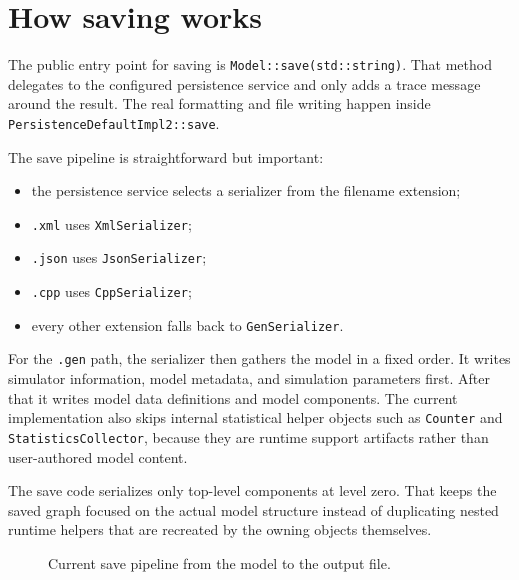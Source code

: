 \section{How saving works}
\label{sec:model-persistence-saving}

The public entry point for saving is \texttt{Model::save(std::string)}. That
method delegates to the configured persistence service and only adds a trace
message around the result. The real formatting and file writing happen inside
\texttt{PersistenceDefaultImpl2::save}.

The save pipeline is straightforward but important:
\begin{itemize}
\item the persistence service selects a serializer from the filename
      extension;
\item \texttt{.xml} uses \texttt{XmlSerializer};
\item \texttt{.json} uses \texttt{JsonSerializer};
\item \texttt{.cpp} uses \texttt{CppSerializer};
\item every other extension falls back to \texttt{GenSerializer}.
\end{itemize}

For the \texttt{.gen} path, the serializer then gathers the model in a fixed
order. It writes simulator information, model metadata, and simulation
parameters first. After that it writes model data definitions and model
components. The current implementation also skips internal statistical helper
objects such as \texttt{Counter} and \texttt{StatisticsCollector}, because they
are runtime support artifacts rather than user-authored model content.

The save code serializes only top-level components at level zero. That keeps the
saved graph focused on the actual model structure instead of duplicating nested
runtime helpers that are recreated by the owning objects themselves.

\begin{figure}[htbp]
\centering
\caption{Current save pipeline from the model to the output file.}
\label{fig:model-persistence-save-pipeline}
\end{figure}

